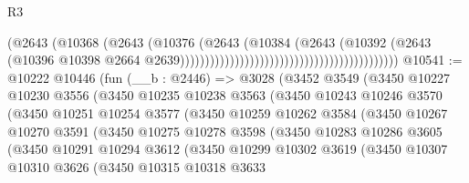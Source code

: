 \begin{lexlean}{R3}
\begin{coremodule}
                                                                        (@2643
                                                                          (@10368
                                                                            (@2643
                                                                              (@10376
                                                                                (@2643
                                                                                  (@10384
                                                                                    (@2643
                                                                                      (@10392
                                                                                        (@2643
                                                                                          (@10396
                                                                                            @10398
                                                                                            @2664
                                                                                            @2639))))))))))))))))))))))))))))))))))))))))))))
@10541 := @10222
    @10446
    (fun (__b : @2446) =>
    @3028
      (@3452
        @3549
        (@3450
          @10227
          @10230
          @3556
          (@3450
            @10235
            @10238
            @3563
            (@3450
              @10243
              @10246
              @3570
              (@3450
                @10251
                @10254
                @3577
                (@3450
                  @10259
                  @10262
                  @3584
                  (@3450
                    @10267
                    @10270
                    @3591
                    (@3450
                      @10275
                      @10278
                      @3598
                      (@3450
                        @10283
                        @10286
                        @3605
                        (@3450
                          @10291
                          @10294
                          @3612
                          (@3450
                            @10299
                            @10302
                            @3619
                            (@3450
                              @10307
                              @10310
                              @3626
                              (@3450
                                @10315
                                @10318
                                @3633

\end{coremodule}
\end{lexlean}
